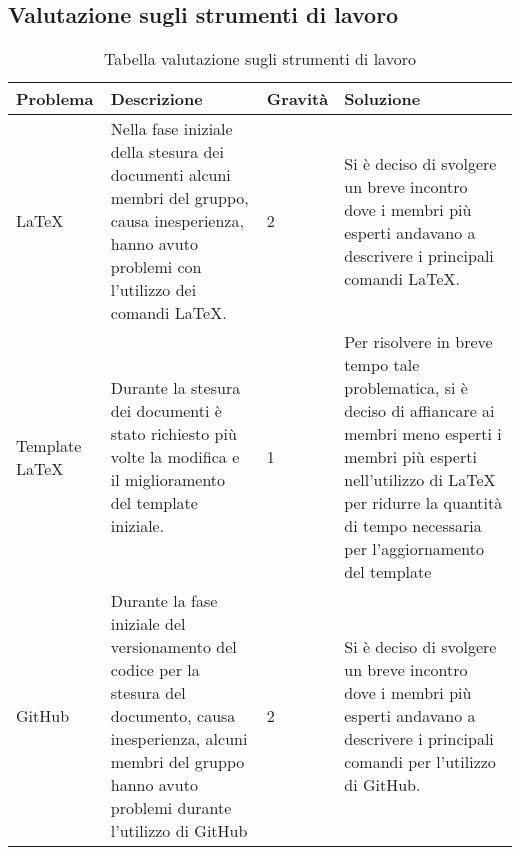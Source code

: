 \subsection{Valutazione sugli strumenti di lavoro}

{

\centering
\renewcommand{\arraystretch}{2}
\begin{longtable}{C{2cm} C{5cm} C{2cm} C{5.2cm}}
\caption{Tabella valutazione sugli strumenti di lavoro}\\
\textbf{Problema} &
\textbf{Descrizione}&
\textbf{Gravità}&
\textbf{Soluzione}\\
\endhead


\LaTeX & Nella fase iniziale della stesura dei documenti alcuni membri del gruppo, causa inesperienza, hanno avuto problemi con l'utilizzo dei comandi \LaTeX. & 2 & Si è deciso di svolgere un breve incontro dove i membri più esperti andavano a descrivere i principali comandi \LaTeX. \\
Template \LaTeX & Durante la stesura dei documenti è stato richiesto più volte la modifica e il miglioramento del template iniziale. & 1 & Per risolvere in breve tempo tale problematica, si è deciso di affiancare ai membri meno esperti i membri più esperti nell'utilizzo di \LaTeX{} per ridurre la quantità di tempo necessaria per l'aggiornamento del template \\
GitHub & Durante la fase iniziale del versionamento del codice per la stesura del documento, causa inesperienza, alcuni membri del gruppo hanno avuto problemi durante l'utilizzo di GitHub & 2 & Si è deciso di svolgere un breve incontro dove i membri più esperti andavano a descrivere i principali comandi per l'utilizzo di GitHub.\\


\end{longtable}
}